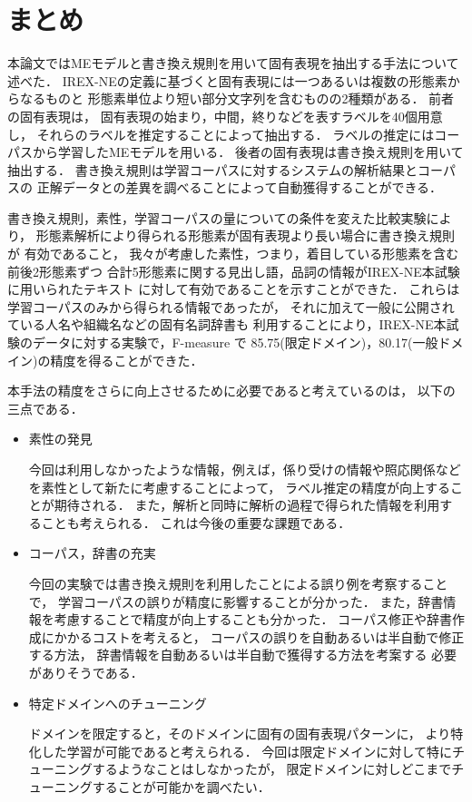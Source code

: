 \section{まとめ}

本論文ではMEモデルと書き換え規則を用いて固有表現を抽出する手法について述べた．
IREX-NEの定義に基づくと固有表現には一つあるいは複数の形態素からなるものと
形態素単位より短い部分文字列を含むものの2種類がある．
前者の固有表現は，
固有表現の始まり，中間，終りなどを表すラベルを40個用意し，
それらのラベルを推定することによって抽出する．
ラベルの推定にはコーパスから学習したMEモデルを用いる．
後者の固有表現は書き換え規則を用いて抽出する．
書き換え規則は学習コーパスに対するシステムの解析結果とコーパスの
正解データとの差異を調べることによって自動獲得することができる．

書き換え規則，素性，学習コーパスの量についての条件を変えた比較実験により，
形態素解析により得られる形態素が固有表現より長い場合に書き換え規則が
有効であること，
我々が考慮した素性，つまり，着目している形態素を含む前後2形態素ずつ
合計5形態素に関する見出し語，品詞の情報がIREX-NE本試験に用いられたテキスト
に対して有効であることを示すことができた．
これらは学習コーパスのみから得られる情報であったが，
それに加えて一般に公開されている人名や組織名などの固有名詞辞書も
利用することにより，IREX-NE本試験のデータに対する実験で，F-measure で
85.75(限定ドメイン)，80.17(一般ドメイン)の精度を得ることができた．

本手法の精度をさらに向上させるために必要であると考えているのは，
以下の三点である．
\begin{itemize}
\item 素性の発見

  今回は利用しなかったような情報，例えば，係り受けの情報や照応関係など
  を素性として新たに考慮することによって，
  ラベル推定の精度が向上することが期待される．
  また，解析と同時に解析の過程で得られた情報を利用することも考えられる．
  これは今後の重要な課題である．
\item コーパス，辞書の充実

  今回の実験では書き換え規則を利用したことによる誤り例を考察することで，
  学習コーパスの誤りが精度に影響することが分かった．
  また，辞書情報を考慮することで精度が向上することも分かった．
  コーパス修正や辞書作成にかかるコストを考えると，
  コーパスの誤りを自動あるいは半自動で修正する方法，
  辞書情報を自動あるいは半自動で獲得する方法を考案する
  必要がありそうである．
\item 特定ドメインへのチューニング

  ドメインを限定すると，そのドメインに固有の固有表現パターンに，
  より特化した学習が可能であると考えられる．
  今回は限定ドメインに対して特にチューニングするようなことはしなかったが，
  限定ドメインに対しどこまでチューニングすることが可能かを調べたい．
\end{itemize}

